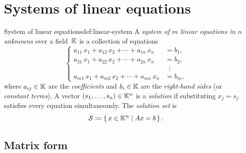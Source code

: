 \section{Systems of linear equations}\label{sec:linear-systems}

\begin{definition}{System of linear equations}{def:linear-system}
A \emph{system of $m$ linear equations in $n$ unknowns} over a
field~${\mathbb{K}}$ is a collection of equations
\[
  \left\{
  \begin{aligned}
    a_{11}\,x_1 + a_{12}\,x_2 + \cdots + a_{1n}\,x_n &= b_1,\\
    a_{21}\,x_1 + a_{22}\,x_2 + \cdots + a_{2n}\,x_n &= b_2,\\
    &\;\;\vdots \\
    a_{m1}\,x_1 + a_{m2}\,x_2 + \cdots + a_{mn}\,x_n &= b_m,
  \end{aligned}
  \right.
\]
where $a_{ij}\in{\mathbb{K}}$ are the \emph{coefficients}
and $b_i\in{\mathbb{K}}$ are the \emph{right-hand sides} (or \emph{constant
terms}). A vector $(s_1,\dots,s_n)\in{\mathbb{K}}^n$ is a \emph{solution} if
substituting $x_j = s_j$ satisfies every equation simultaneously. The
\emph{solution set} is
\[
  {\mathcal{S}} \coloneqq \left\{\,x\in{\mathbb{K}}^n\;\middle|\;Ax = b\,\right\}.
\]
\end{definition}

\subsection{Matrix form}\label{subsec:matrix-form}

